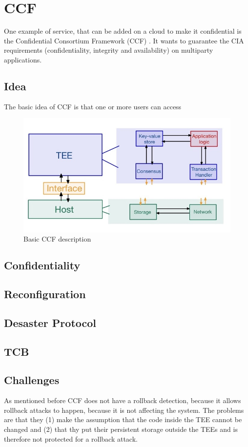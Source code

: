 \section{CCF}
One example of service, that can be added on a cloud to make it confidential is the Confidential Consortium Framework (CCF) \cite{Howard}. It wants to guarantee the CIA requirements (confidentiality, integrity and availability) on multiparty applications.
\subsection{Idea}
The basic idea of CCF is that one or more users can access 
\begin{figure}[h]
	\includegraphics[scale=0.35]{pictures/basic_ccf}
	\caption{Basic CCF description}
	\label{cia}
\end{figure}
\subsection{Confidentiality}
\subsection{Reconfiguration}
\subsection{Desaster Protocol}
\subsection{TCB}
\subsection{Challenges}
As mentioned before CCF does not have a rollback detection, because it allows rollback attacks to happen, because it is not affecting the system. The problems are that they (1) make the assumption that the code inside the TEE cannot be changed and (2) that thy put their persistent storage outside the TEEs and is therefore not protected for a rollback attack.